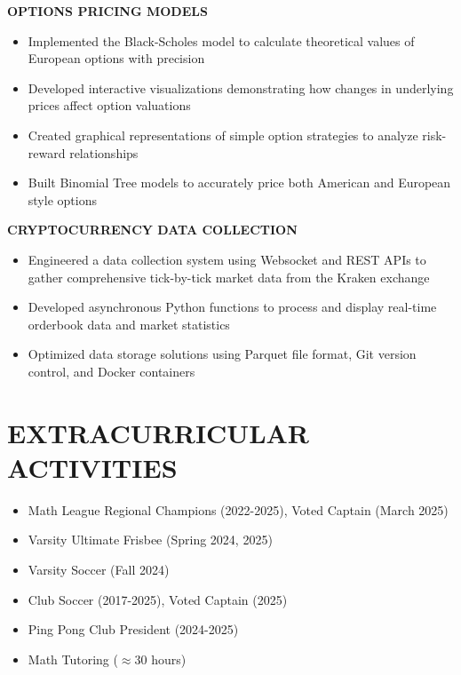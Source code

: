 \documentclass[11pt,letterpaper]{article}
\begin{document}
\begin{flushleft}
\textbf{\color{subheadingcolor}OPTIONS PRICING MODELS}
\begin{itemize}[leftmargin=*,nosep]
    \item Implemented the Black-Scholes model to calculate theoretical values of European options with precision
    \item Developed interactive visualizations demonstrating how changes in underlying prices affect option valuations
    \item Created graphical representations of simple option strategies to analyze risk-reward relationships
    \item Built Binomial Tree models to accurately price both American and European style options
\end{itemize}
\end{flushleft}

\begin{flushleft}
\textbf{\color{subheadingcolor}CRYPTOCURRENCY DATA COLLECTION}
\begin{itemize}[leftmargin=*,nosep]
    \item Engineered a data collection system using Websocket and REST APIs to gather comprehensive tick-by-tick market data from the Kraken exchange
    \item Developed asynchronous Python functions to process and display real-time orderbook data and market statistics
    \item Optimized data storage solutions using Parquet file format, Git version control, and Docker containers
\end{itemize}
\end{flushleft}

\vspace{1em}
\section{EXTRACURRICULAR ACTIVITIES}

\vspace{0.5em}
\begin{itemize}[leftmargin=*,nosep]
  \item Math League Regional Champions (2022-2025), Voted Captain (March 2025)
  \item Varsity Ultimate Frisbee (Spring 2024, 2025)
  \item Varsity Soccer (Fall 2024)
  \item Club Soccer (2017-2025), Voted Captain (2025)
  \item Ping Pong Club President (2024-2025)
  \item Math Tutoring ($\approx30$ hours)
\end{itemize}
\end{document}
